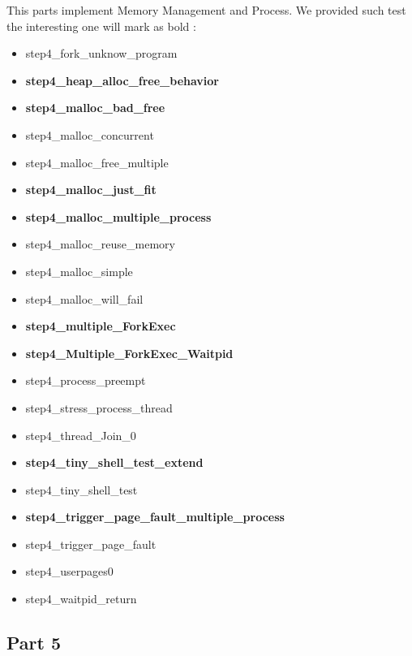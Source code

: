 \documentclass[a4paper,10pt]{article}
\begin{document}
This parts implement Memory Management and Process. We provided such test the interesting one will mark as bold :
\begin{itemize}
\item step4_fork_unknow_program
\item {\bf step4_heap_alloc_free_behavior}
\item {\bf step4_malloc_bad_free}
\item step4_malloc_concurrent
\item step4_malloc_free_multiple
\item {\bf step4_malloc_just_fit}
\item {\bf step4_malloc_multiple_process}
\item step4_malloc_reuse_memory
\item step4_malloc_simple 
\item step4_malloc_will_fail
\item {\bf step4_multiple_ForkExec}
\item {\bf step4_Multiple_ForkExec_Waitpid} 
\item step4_process_preempt
\item step4_stress_process_thread
\item step4_thread_Join_0
\item {\bf step4_tiny_shell_test_extend}
\item step4_tiny_shell_test
\item {\bf step4_trigger_page_fault_multiple_process}
\item step4_trigger_page_fault
\item step4_userpages0
\item step4_waitpid_return
\end{itemize} 

\subsection{Part 5}
\end{document}
